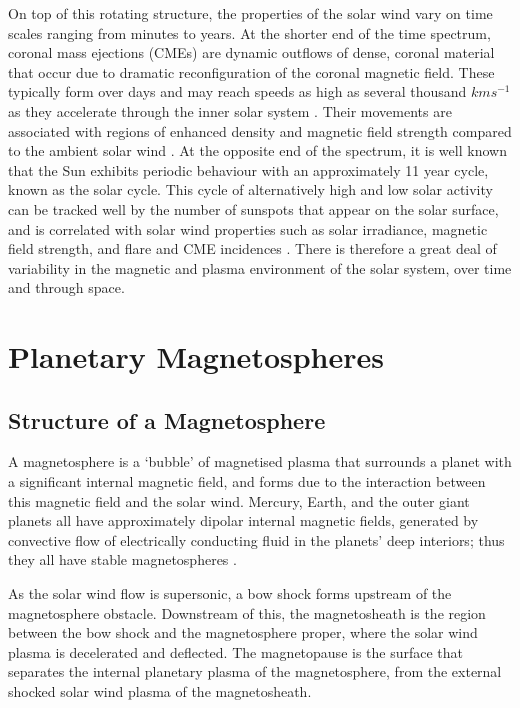 On top of this rotating structure, the properties of the solar wind vary on time scales ranging from minutes to years. At the shorter end of the time spectrum, coronal mass ejections (CMEs) are dynamic outflows of dense, coronal material that occur due to dramatic reconfiguration of the coronal magnetic field. These typically form over days and may reach speeds as high as several thousand $\si{km s^{-1}}$ as they accelerate through the inner solar system \citep{russell2016}. Their movements are associated with regions of enhanced density and magnetic field strength compared to the ambient solar wind \citep{odstrcil1999}. At the opposite end of the spectrum, it is well known that the Sun exhibits periodic behaviour with an approximately 11 year cycle, known as the solar cycle. This cycle of alternatively high and low solar activity can be tracked well by the number of sunspots that appear on the solar surface, and is correlated with solar wind properties such as solar irradiance, magnetic field strength, and flare and CME incidences \citep{hathaway2015}. There is therefore a great deal of variability in the magnetic and plasma environment of the solar system, over time and through space.

\section{Planetary Magnetospheres}
\subsection{Structure of a Magnetosphere}
A magnetosphere is a `bubble' of magnetised plasma that surrounds a planet with a significant internal magnetic field, and forms due to the interaction between this magnetic field and the solar wind. Mercury, Earth, and the outer giant planets all have approximately dipolar internal magnetic fields, generated by convective flow of electrically conducting fluid in the planets' deep interiors; thus they all have stable magnetospheres \citep{kivelson2014book}.

As the solar wind flow is supersonic, a bow shock forms upstream of the magnetosphere obstacle. Downstream of this, the magnetosheath is the region between the bow shock and the magnetosphere proper, where the solar wind plasma is decelerated and deflected. The magnetopause is the surface that separates the internal planetary plasma of the magnetosphere, from the external shocked solar wind plasma of the magnetosheath. 

